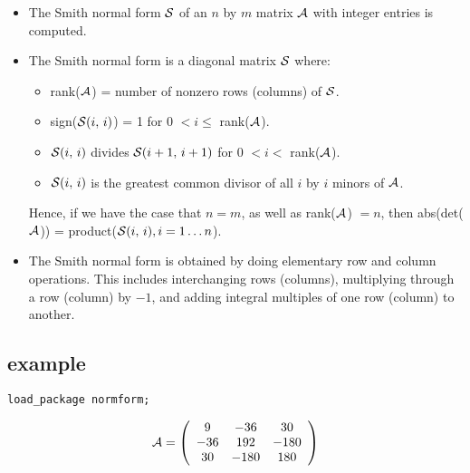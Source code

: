 \begin{itemize}
\item The Smith normal form ${\cal S}$ of an $n$ by $m$ matrix 
${\cal A}$ with integer entries is computed.

\item The Smith normal form is a diagonal matrix ${\cal S}$ where:

  \begin{itemize}
  \item rank(${\cal A}$) = number of nonzero rows (columns) of 
        ${\cal S}$.
  \item sign(${\cal S}(i,\, i)$) = 1 for 0 $< i \leq $ rank(${\cal A}$).
  \item ${\cal S}(i,\, i)$ divides ${\cal S}(i+1,\, i+1)$ for 0 $< i
        <$ rank(${\cal A}$).
  \item ${\cal S}(i,\,i)$ is the greatest common divisor of all $i$ by 
        $i$ minors of ${\cal A}$.
  \end{itemize}

      Hence, if we have the case that $n = m$, as well as 
      rank(${\cal A}$) $= n$, then abs(det(${\cal A}$)) = 
      product(${\cal S}(i,\,i),i=1\ldots n$).
      
\item The Smith normal form is obtained by doing elementary row and 
      column operations. This includes interchanging rows (columns),
      multiplying through a row (column) by $-1$, and adding integral 
      multiples of one row (column) to another. 
\end{itemize}

\subsection{example}

{\tt load\_package normform;}

\begin{displaymath}
{\cal A} = \left( \begin{array}{ccc} 9 & -36 & 30 \\ -36 & 192 & -180 \\
30 & -180 & 180  \end{array} 
\right)
\end{displaymath}

